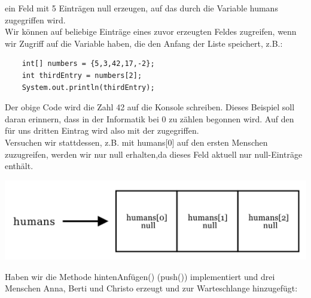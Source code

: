\documentclass{article}
\begin{document}
ein Feld mit 5 Einträgen null erzeugen, auf das durch die Variable humans zugegriffen wird. \\
Wir können auf beliebige Einträge eines zuvor erzeugten Feldes zugreifen, wenn wir Zugriff auf die Variable haben, die den Anfang der Liste speichert, z.B.:
\begin{verbatim}
    int[] numbers = {5,3,42,17,-2};
    int thirdEntry = numbers[2];
    System.out.println(thirdEntry);
\end{verbatim}

Der obige Code wird die Zahl 42 auf die Konsole schreiben. Dieses Beispiel soll daran erinnern, dass
in der Informatik bei 0 zu zählen begonnen wird. Auf den für uns dritten Eintrag wird also mit der 
 zugegriffen. \\

Versuchen wir stattdessen, z.B. mit humans[0] auf den ersten Menschen zuzugreifen, werden wir nur null erhalten,da dieses Feld aktuell nur null-Einträge enthält. 

\begin{center}
    \includegraphics[scale=0.2]{../../media/queue_humans_null.png}
\end{center}

Haben wir die Methode hintenAnfügen() (push()) implementiert und drei Menschen Anna, Berti und Christo 
erzeugt und zur Warteschlange hinzugefügt: 
\end{document}
